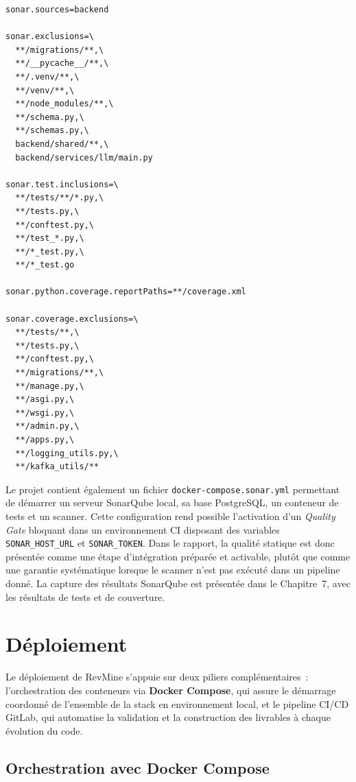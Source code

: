 \begin{lstlisting}[caption={Extrait de configuration SonarQube pour l'analyse backend}, label={lst:sonar-exclusions}]
sonar.sources=backend

sonar.exclusions=\
  **/migrations/**,\
  **/__pycache__/**,\
  **/.venv/**,\
  **/venv/**,\
  **/node_modules/**,\
  **/schema.py,\
  **/schemas.py,\
  backend/shared/**,\
  backend/services/llm/main.py

sonar.test.inclusions=\
  **/tests/**/*.py,\
  **/tests.py,\
  **/conftest.py,\
  **/test_*.py,\
  **/*_test.py,\
  **/*_test.go

sonar.python.coverage.reportPaths=**/coverage.xml

sonar.coverage.exclusions=\
  **/tests/**,\
  **/tests.py,\
  **/conftest.py,\
  **/migrations/**,\
  **/manage.py,\
  **/asgi.py,\
  **/wsgi.py,\
  **/admin.py,\
  **/apps.py,\
  **/logging_utils.py,\
  **/kafka_utils/**
\end{lstlisting}

Le projet contient également un fichier \texttt{docker-compose.sonar.yml} permettant de démarrer
un serveur SonarQube local, sa base PostgreSQL, un conteneur de tests et un scanner. Cette
configuration rend possible l'activation d'un \textit{Quality Gate} bloquant dans un environnement
CI disposant des variables \texttt{SONAR\_HOST\_URL} et \texttt{SONAR\_TOKEN}. Dans le rapport, la
qualité statique est donc présentée comme une étape d'intégration préparée et activable, plutôt
que comme une garantie systématique lorsque le scanner n'est pas exécuté dans un pipeline donné.
La capture des résultats SonarQube est présentée dans le Chapitre~7, avec les résultats de tests
et de couverture.

\section{Déploiement}
\label{sec:deploiement}

Le déploiement de RevMine s'appuie sur deux piliers complémentaires~: l'orchestration des
conteneurs via \textbf{Docker Compose}, qui assure le démarrage coordonné de l'ensemble de la
stack en environnement local, et le pipeline CI/CD GitLab, qui automatise la validation et la
construction des livrables à chaque évolution du code.

\subsection{Orchestration avec Docker Compose}

